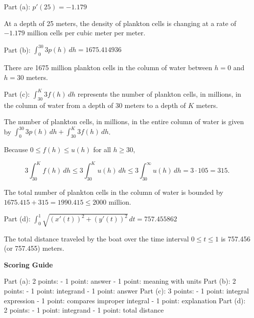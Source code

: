 \documentclass[12pt,addpoints,answers]{exam}
\begin{document}
\begin{questions}
\begin{solution}
Part (a): $p'(25) = -1.179$ \par At a depth of 25 meters, the density of plankton cells is changing at a rate of $-1.179$ million cells per cubic meter per meter. \par Part (b): $\int_0^{30} 3p(h)\,dh = 1675.414936$ \par There are 1675 million plankton cells in the column of water between $h = 0$ and $h = 30$ meters. \par Part (c): $\int_{30}^K 3f(h)\,dh$ represents the number of plankton cells, in millions, in the column of water from a depth of 30 meters to a depth of $K$ meters. \par The number of plankton cells, in millions, in the entire column of water is given by $\int_0^{30} 3p(h)\,dh + \int_{30}^K 3f(h)\,dh$. \par Because $0 \le f(h) \le u(h)$ for all $h \ge 30$, \par $$3\int_{30}^K f(h)\,dh \le 3\int_{30}^K u(h)\,dh \le 3\int_{30}^\infty u(h)\,dh = 3 \cdot 105 = 315.$$ \par The total number of plankton cells in the column of water is bounded by $1675.415 + 315 = 1990.415 \le 2000$ million. \par Part (d): $\int_0^1 \sqrt{(x'(t))^2 + (y'(t))^2}\,dt = 757.455862$ \par The total distance traveled by the boat over the time interval $0 \le t \le 1$ is 757.456 (or 757.455) meters.
\par\medskip
\textbf{Scoring Guide}\par
Part (a): 2 points: - 1 point: answer - 1 point: meaning with units Part (b): 2 points: - 1 point: integrand - 1 point: answer Part (c): 3 points: - 1 point: integral expression - 1 point: compares improper integral - 1 point: explanation Part (d): 2 points: - 1 point: integrand - 1 point: total distance
\end{solution}


\end{questions}
\end{document}
